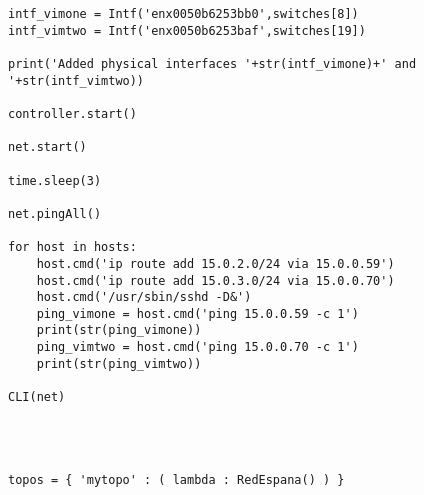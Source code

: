 \begin{lstlisting}
intf_vimone = Intf('enx0050b6253bb0',switches[8])
intf_vimtwo = Intf('enx0050b6253baf',switches[19])

print('Added physical interfaces '+str(intf_vimone)+' and '+str(intf_vimtwo))

controller.start()

net.start()

time.sleep(3)

net.pingAll()

for host in hosts:
	host.cmd('ip route add 15.0.2.0/24 via 15.0.0.59')
	host.cmd('ip route add 15.0.3.0/24 via 15.0.0.70')
	host.cmd('/usr/sbin/sshd -D&')
	ping_vimone = host.cmd('ping 15.0.0.59 -c 1')
	print(str(ping_vimone))
	ping_vimtwo = host.cmd('ping 15.0.0.70 -c 1')
	print(str(ping_vimtwo))

CLI(net)




topos = { 'mytopo' : ( lambda : RedEspana() ) }
\end{lstlisting}


\cleardoublepage
